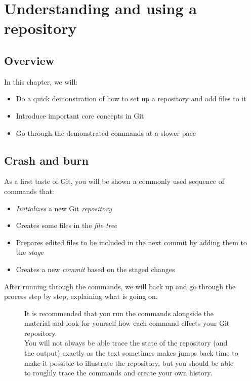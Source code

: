 \documentclass[../main/git_course_main.tex]{subfiles}
\begin{document}
	
	
	\setcounter{chapter}{1}
	\chapter{Understanding and using a repository}
	
	\section{Overview}
	
	In this chapter, we will:
	
	\begin{itemize}
		\item Do a quick demonstration of how to set up a repository and add files to it
		\item Introduce important core concepts in Git
		\item Go through the demonstrated commands at a slower pace
	\end{itemize}
	
	\section{Crash and burn}
	
	As a first taste of Git, you will be shown a commonly used sequence of commands that:
	
	\begin{itemize}
		\item \textit{Initializes} a new Git \textit{repository}
		\item Creates some files in the \textit{file tree}
		\item Prepares edited files to be included in the next commit by adding them to the \textit{stage}
		\item Creates a new \textit{commit} based on the staged changes
	\end{itemize}
	
	After running through the commands, we will back up and go through the process step by step, explaining what is going on.
	
	\begin{figure}[h!]
		\begin{redbox}
			It is recommended that you run the commands alongside the material and look for yourself how each command effects your Git repository. \\
			
			You will not always be able trace the state of the repository (and the output) exactly as the text sometimes makes jumps back time to make it possible to illustrate the repository, but you should be able to roughly trace the commands and create your own history.
		\end{redbox}
	\end{figure}
	
\end{document}
